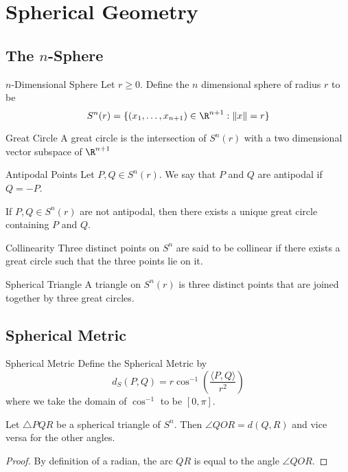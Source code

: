 \pagebreak
\section{Spherical Geometry}
\subsection{The $n$-Sphere}
\begin{defn}{$n$-Dimensional Sphere}{} Let $r\geq 0$. Define the $n$ dimensional sphere of radius $r$ to be $$S^n(r)=\{(x_1,\dots,x_{n+1})\in\R^{n+1}:\|x\|=r\}$$
\end{defn}

\begin{defn}{Great Circle}{} A great circle is the intersection of $S^n(r)$ with a two dimensional vector subspace of $\R^{n+1}$
\end{defn}

\begin{defn}{Antipodal Points}{} Let $P,Q\in S^n(r)$. We say that $P$ and $Q$ are antipodal if $Q=-P$. 
\end{defn}

\begin{lmm}{}{} If $P,Q\in S^n(r)$ are not antipodal, then there exists a unique great circle containing $P$ and $Q$. 
\end{lmm}

\begin{defn}{Collinearity}{} Three distinct points on $S^n$ are said to be collinear if there exists a great circle such that the three points lie on it. 
\end{defn}

\begin{defn}{Spherical Triangle}{} A triangle on $S^n(r)$ is three distinct points that are joined together by three great circles. 
\end{defn}

\subsection{Spherical Metric}
\begin{defn}{Spherical Metric}{} Define the Spherical Metric by $$d_S(P,Q)=r\cos^{-1}\left(\frac{\langle P,Q\rangle}{r^2}\right)$$ where we take the domain of $\cos^{-1}$ to be $[0,\pi]$. 
\end{defn}

\begin{prp}{}{} Let $\triangle PQR$ be a spherical triangle of $S^n$. Then $\angle QOR=d(Q,R)$ and vice versa for the other angles. \tcbline
\begin{proof} By definition of a radian, the arc $QR$ is equal to the angle $\angle QOR$. 
\end{proof}
\end{prp}

